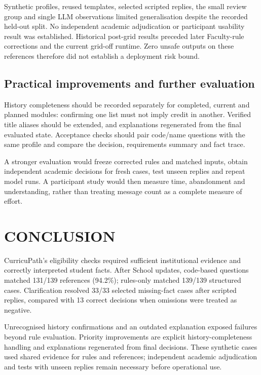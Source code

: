 Synthetic profiles, reused templates, selected scripted replies, the small review group and single LLM observations limited generalisation despite the recorded held-out split. No independent academic adjudication or participant usability result was established. Historical post-grid results preceded later Faculty-rule corrections and the current grid-off runtime. Zero unsafe outputs on these references therefore did not establish a deployment risk bound.

\subsection{Practical improvements and further evaluation}
History completeness should be recorded separately for completed, current and planned modules: confirming one list must not imply credit in another. Verified title aliases should be extended, and explanations regenerated from the final evaluated state. Acceptance checks should pair code/name questions with the same profile and compare the decision, requirements summary and fact trace.

A stronger evaluation would freeze corrected rules and matched inputs, obtain independent academic decisions for fresh cases, test unseen replies and repeat model runs. A participant study would then measure time, abandonment and understanding, rather than treating message count as a complete measure of effort.

\newpage
\section{CONCLUSION}
CurricuPath's eligibility checks required sufficient institutional evidence and correctly interpreted student facts. After School updates, code-based questions matched 131/139 references (94.2\%); rules-only matched 139/139 structured cases. Clarification resolved 33/33 selected missing-fact cases after scripted replies, compared with 13 correct decisions when omissions were treated as negative.

Unrecognised history confirmations and an outdated explanation exposed failures beyond rule evaluation. Priority improvements are explicit history-completeness handling and explanations regenerated from final decisions. These synthetic cases used shared evidence for rules and references; independent academic adjudication and tests with unseen replies remain necessary before operational use.

